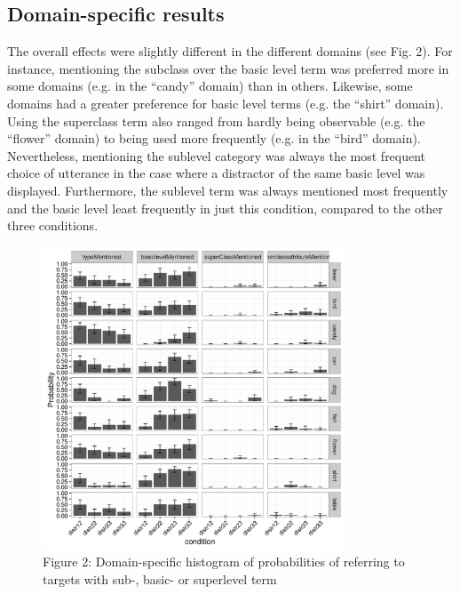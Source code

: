 \documentclass[10pt,letterpaper]{article}
\begin{document}
\subsection{\bf Domain-specific results}
The overall effects were slightly different in the different domains (see Fig. 2). For instance, mentioning the subclass over the basic level term was preferred more in some domains (e.g. in the “candy” domain) than in others. Likewise, some domains had a greater preference for basic level terms (e.g. the “shirt” domain). Using the superclass term also ranged from hardly being observable (e.g. the “flower” domain) to being used more frequently (e.g. in the “bird” domain). Nevertheless, mentioning the sublevel category was always the most frequent choice of utterance in the case where a distractor of the same basic level was displayed. Furthermore, the sublevel term was always mentioned most frequently and the basic level least frequently in just this condition, compared to the other three conditions.

\begin{figure}[ht!]
\centering
\includegraphics[width=90mm]{graphs/proportion_mentioned_features_by_domain.pdf}
\caption{Figure 2: Domain-specific histogram of probabilities of referring to targets with sub-, basic- or superlevel term \label{overflow}}
\end{figure}
\end{document}
